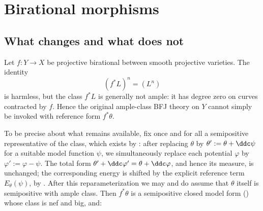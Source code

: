 \section{Birational morphisms}
\label{sec:ch30-birational}

\subsection{What changes and what does not}
\label{sec:ch30-birational-setting}

Let $f:Y\to X$ be projective birational between smooth projective
varieties.  The identity
\begin{equation}
\label{eq:birational-top-intersection}
                         (f^*L)^n=(L^n)
\end{equation}
is harmless, but the class $f^*L$ is generally not ample: it has degree
zero on curves contracted by $f$.  Hence the original ample-class BFJ
theory on $Y$ cannot simply be invoked with reference form $f^*\theta$.

To be precise about what remains available, fix once and for all a
semipositive representative of the class, which exists by
: after replacing $\theta$ by
$\theta':=\theta+\ddc\psi$ for a suitable model function $\psi$, we
simultaneously replace each potential $\varphi$ by
$\varphi':=\varphi-\psi$.  The total form
$\theta'+\ddc\varphi'=\theta+\ddc\varphi$, and hence its measure, is
unchanged; the corresponding energy is shifted by the explicit reference
term $E_\theta(\psi)$, by
.  After this
reparameterization we may and do assume that $\theta$ itself is
semipositive with ample class.  Then
$f^*\theta$ is a semipositive closed model form
() whose class is nef and big, and:

